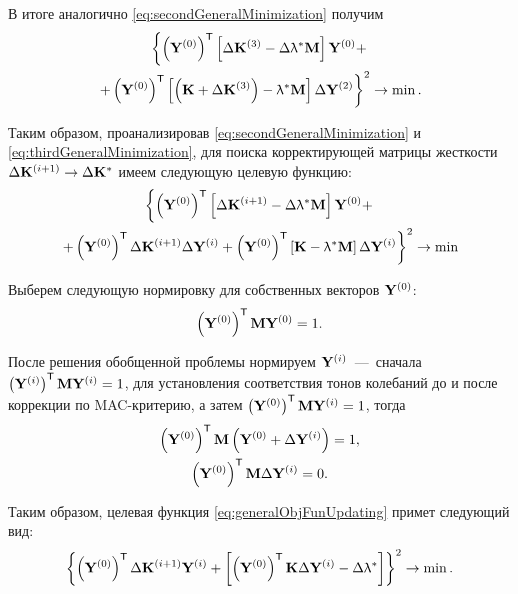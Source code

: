 В итоге аналогично \eqref{eq:secondGeneralMinimization} получим
\begin{gather}
	\left\{ \left( \mathbf{Y} ^ {(0)} \right) ^ \mathsf{T} \left[ \Delta \mathbf{K} ^ {(3)} - \Delta \uplambda ^ \ast \mathbf{M} \right] \mathbf{Y} ^ {(0)} + \right. \nonumber \\
	\left. + \left( \mathbf{Y} ^ {(0)} \right) ^ \mathsf{T} \left[ \left( \mathbf{K} + \Delta \mathbf{K} ^ {(3)} \right) - \uplambda ^ \ast \mathbf{M} \right] \Delta \mathbf{Y} ^ {(2)} \right\} ^ 2 \rightarrow \min.
	\label{eq:thirdGeneralMinimization}
\end{gather}

Таким образом, проанализировав \eqref{eq:secondGeneralMinimization} и \eqref{eq:thirdGeneralMinimization}, для
поиска корректирующей матрицы жесткости $ \Delta \mathbf{K} ^ {(i + 1)} \rightarrow \Delta \mathbf{K} ^ \ast $ имеем следующую целевую функцию:
\begin{gather}
	\left\{ \left( \mathbf{Y} ^ {(0)} \right) ^ \mathsf{T} \left[ \Delta \mathbf{K} ^ {(i + 1)} - \Delta \uplambda ^ \ast \mathbf{M} \right] \mathbf{Y} ^ {(0)} + \right. \nonumber \\
	\left. + \left( \mathbf{Y} ^ {(0)} \right) ^ \mathsf{T} \Delta \mathbf{K} ^ {(i + 1)} \Delta \mathbf{Y} ^ {(i)} + \left( \mathbf{Y} ^ {(0)} \right) ^ \mathsf{T} \left[ \mathbf{K} - \uplambda ^ \ast \mathbf{M} \right] \Delta \mathbf{Y} ^ {(i)} \right\} ^ 2 \rightarrow \min
	\label{eq:generalObjFunUpdating}
\end{gather}

Выберем следующую нормировку для собственных векторов $ \mathbf{Y} ^ {(0)} $:
\begin{equation*}
	\left( \mathbf{Y} ^ {(0)} \right) ^ \mathsf{T} \mathbf{M} \mathbf{Y} ^ {(0)} = 1.
\end{equation*}

После решения обобщенной проблемы нормируем $ \mathbf{Y} ^ {(i)} $~---~сначала $ \left( \mathbf{Y} ^ {(i)} \right) ^ \mathsf{T} \mathbf{M} \mathbf{Y} ^ {(i)} = 1 $, для установления соответствия тонов колебаний до и после коррекции по MAC-критерию, а затем $ \left( \mathbf{Y} ^ {(0)} \right) ^ \mathsf{T} \mathbf{M} \mathbf{Y} ^ {(i)} = 1 $, тогда
\begin{gather*}
	\left( \mathbf{Y} ^ {(0)} \right) ^ \mathsf{T} \mathbf{M} \left( \mathbf{Y} ^ {(0)} + \Delta \mathbf{Y} ^ {(i)} \right) = 1, \\
	\left( \mathbf{Y} ^ {(0)} \right) ^ \mathsf{T} \mathbf{M} \Delta \mathbf{Y} ^ {(i)} = 0.
\end{gather*}

Таким образом, целевая функция \eqref{eq:generalObjFunUpdating} примет следующий вид:
\begin{equation}
	\left\{ \left( \mathbf{Y} ^ {(0)} \right) ^ \mathsf{T} \Delta \mathbf{K} ^ {(i + 1)} \mathbf{Y} ^ {(i)} + \left[ \left( \mathbf{Y} ^ {(0)} \right) ^ \mathsf{T} \mathbf{K} \Delta \mathbf{Y} ^ {(i)} - \Delta \uplambda ^ \ast \right] \right\} ^ 2 \rightarrow \min.
	\label{eq:finalObjFunUpdating}
\end{equation}

